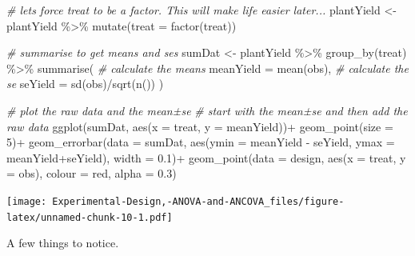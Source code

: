 \documentclass[
]{book}
\newenvironment{Shaded}{\begin{snugshade}}{\end{snugshade}}
\newcommand{\AttributeTok}[1]{\textcolor[rgb]{0.77,0.63,0.00}{#1}}
\newcommand{\CommentTok}[1]{\textcolor[rgb]{0.56,0.35,0.01}{\textit{#1}}}
\newcommand{\DecValTok}[1]{\textcolor[rgb]{0.00,0.00,0.81}{#1}}
\newcommand{\FloatTok}[1]{\textcolor[rgb]{0.00,0.00,0.81}{#1}}
\newcommand{\FunctionTok}[1]{\textcolor[rgb]{0.00,0.00,0.00}{#1}}
\newcommand{\NormalTok}[1]{#1}
\newcommand{\OtherTok}[1]{\textcolor[rgb]{0.56,0.35,0.01}{#1}}
\newcommand{\SpecialCharTok}[1]{\textcolor[rgb]{0.00,0.00,0.00}{#1}}
\newcommand{\StringTok}[1]{\textcolor[rgb]{0.31,0.60,0.02}{#1}}
\begin{document}
\begin{Shaded}
\begin{Highlighting}[]
\CommentTok{\# let\textquotesingle{}s force treat to be a factor.  This will make life easier later...}
\NormalTok{plantYield }\OtherTok{\textless{}{-}}\NormalTok{ plantYield }\SpecialCharTok{\%\textgreater{}\%} 
  \FunctionTok{mutate}\NormalTok{(}\AttributeTok{treat =} \FunctionTok{factor}\NormalTok{(treat))}

\CommentTok{\# summarise to get means and ses}
\NormalTok{sumDat }\OtherTok{\textless{}{-}}\NormalTok{ plantYield }\SpecialCharTok{\%\textgreater{}\%} 
  \FunctionTok{group\_by}\NormalTok{(treat) }\SpecialCharTok{\%\textgreater{}\%} 
  \FunctionTok{summarise}\NormalTok{(}
    \CommentTok{\# calculate the means}
    \AttributeTok{meanYield =} \FunctionTok{mean}\NormalTok{(obs),}
    \CommentTok{\# calculate the se}
    \AttributeTok{seYield =} \FunctionTok{sd}\NormalTok{(obs)}\SpecialCharTok{/}\FunctionTok{sqrt}\NormalTok{(}\FunctionTok{n}\NormalTok{())}
\NormalTok{  )}

\CommentTok{\# plot the raw data and the mean±se}
\CommentTok{\# start with the mean±se and then add the raw data}
\FunctionTok{ggplot}\NormalTok{(sumDat, }\FunctionTok{aes}\NormalTok{(}\AttributeTok{x =}\NormalTok{ treat, }\AttributeTok{y =}\NormalTok{ meanYield))}\SpecialCharTok{+}
  \FunctionTok{geom\_point}\NormalTok{(}\AttributeTok{size =} \DecValTok{5}\NormalTok{)}\SpecialCharTok{+}
  \FunctionTok{geom\_errorbar}\NormalTok{(}\AttributeTok{data =}\NormalTok{ sumDat, }\FunctionTok{aes}\NormalTok{(}\AttributeTok{ymin =}\NormalTok{ meanYield }\SpecialCharTok{{-}}\NormalTok{ seYield, }\AttributeTok{ymax =}\NormalTok{ meanYield}\SpecialCharTok{+}\NormalTok{seYield),}
                \AttributeTok{width =} \FloatTok{0.1}\NormalTok{)}\SpecialCharTok{+}
  \FunctionTok{geom\_point}\NormalTok{(}\AttributeTok{data =}\NormalTok{ design, }\FunctionTok{aes}\NormalTok{(}\AttributeTok{x =}\NormalTok{ treat, }\AttributeTok{y =}\NormalTok{ obs), }\AttributeTok{colour =} \StringTok{\textquotesingle{}red\textquotesingle{}}\NormalTok{, }\AttributeTok{alpha =} \FloatTok{0.3}\NormalTok{)}
\end{Highlighting}
\end{Shaded}

\texttt{[image: Experimental-Design,-ANOVA-and-ANCOVA\_files/figure-latex/unnamed-chunk-10-1.pdf]}

A few things to notice.
\end{document}
